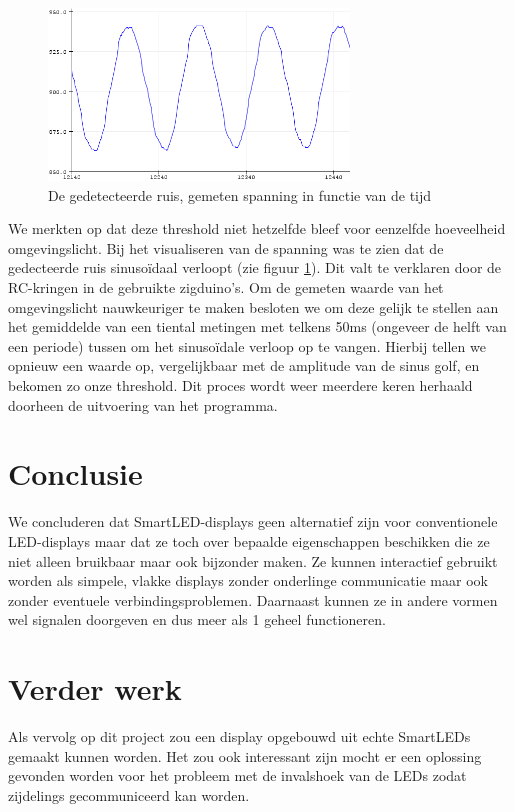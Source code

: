 \documentclass{article}
\begin{document}
\begin{figure}
\centering
\includegraphics[width=8cm]{ruis.png}
\caption{De gedetecteerde ruis, gemeten spanning in functie van de tijd}
\label{fig:ruis}
\end{figure}

We merkten op dat deze threshold niet hetzelfde bleef voor eenzelfde hoeveelheid omgevingslicht. Bij het visualiseren van de spanning was te zien dat de gedecteerde ruis sinusoïdaal verloopt (zie figuur \ref{fig:ruis}). Dit valt te verklaren door de RC-kringen in de gebruikte zigduino's. Om de gemeten waarde van het omgevingslicht nauwkeuriger te maken besloten we om deze gelijk te stellen aan het gemiddelde van een tiental metingen met telkens 50ms (ongeveer de helft van een periode) tussen om het sinusoïdale verloop op te vangen. Hierbij tellen we opnieuw een waarde op, vergelijkbaar met de amplitude van de sinus golf, en bekomen zo onze threshold. Dit proces wordt weer meerdere keren herhaald doorheen de uitvoering van het programma.


\section{Conclusie}
We concluderen dat SmartLED-displays geen alternatief zijn voor conventionele LED-displays maar dat ze toch over bepaalde eigenschappen beschikken die ze niet alleen bruikbaar maar ook bijzonder maken. Ze kunnen interactief gebruikt worden als simpele, vlakke displays zonder onderlinge communicatie maar ook zonder eventuele verbindingsproblemen. Daarnaast kunnen ze in andere vormen wel signalen doorgeven en dus meer als 1 geheel functioneren.


\section{Verder werk}
Als vervolg op dit project zou een display opgebouwd uit echte SmartLEDs gemaakt kunnen worden. Het zou ook interessant zijn mocht er een oplossing gevonden worden voor het probleem met de invalshoek van de LEDs zodat zijdelings gecommuniceerd kan worden.




\end{document}
